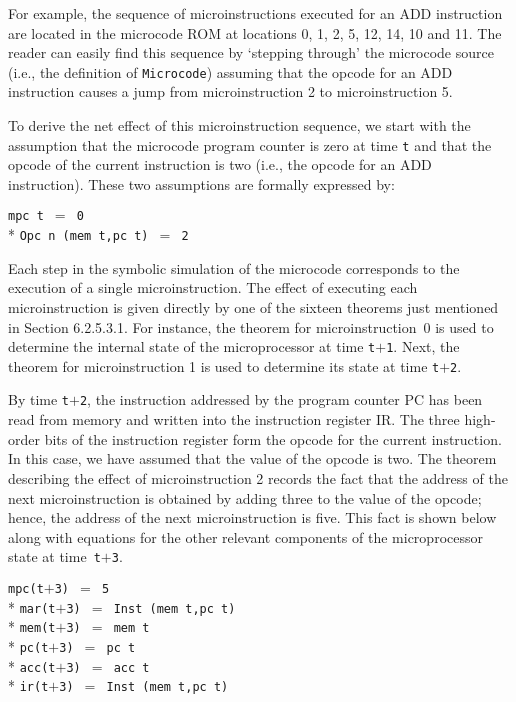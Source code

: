 \begin{normalsize}
For example, the sequence of microinstructions executed
for an ADD instruction are located in the microcode
ROM at locations 0, 1, 2, 5, 12, 14, 10 and 11.
The reader can easily find this sequence
by `stepping through' the microcode source
(i.e., the definition of \verb"Microcode")
assuming that the opcode for an ADD instruction
causes a jump from microinstruction 2 to microinstruction 5.

To derive the net effect of this microinstruction sequence,
we start with the assumption that the microcode program counter is zero
at time \verb"t" and
that the opcode of the current instruction
is two (i.e., the opcode for an ADD instruction).
These two assumptions are formally expressed by:

\hspace*{\fill}
\begin{minipage}{55mm}
\verb"mpc t "$=$\verb" 0"\\*
\verb"Opc n (mem t,pc t) "$=$\verb" 2"
\end{minipage}
\hspace*{\fill}

Each step in the
symbolic simulation of the microcode
corresponds to the execution of a single microinstruction.
The effect of executing each microinstruction is given directly
by one of the sixteen theorems just mentioned in Section 6.2.5.3.1.
For instance,
the theorem for \mbox{microinstruction 0} is used to determine
the internal state of the microprocessor at time \verb"t"$+$\verb"1".
Next, the theorem for microinstruction 1 is used to
determine its state at time \verb"t"$+$\verb"2".

By time \verb"t"$+$\verb"2",
the instruction addressed by the program counter PC has been
read from memory and written into the instruction register IR.
The three high-order bits of the instruction register form the
opcode for the current instruction.
In this case, we have assumed that the value of the opcode is two.
The theorem describing the effect of microinstruction 2 records
the fact that the address of the next microinstruction is obtained
by adding three to the value of the opcode;
hence, the address of the next microinstruction is five.
This fact is shown below along with equations for the other relevant components
of the microprocessor state at \mbox{time \verb"t"$+$\verb"3"}.

\hspace*{\fill}
\begin{minipage}{65mm}
\verb"mpc(t"$+$\verb"3) "$=$\verb" 5"\\*
\verb"mar(t"$+$\verb"3) "$=$\verb" Inst (mem t,pc t)"\\*
\verb"mem(t"$+$\verb"3) "$=$\verb" mem t"\\*
\verb"pc(t"$+$\verb"3) "$=$\verb" pc t"\\*
\verb"acc(t"$+$\verb"3) "$=$\verb" acc t"\\*
\verb"ir(t"$+$\verb"3) "$=$\verb" Inst (mem t,pc t)"
\end{minipage}
\hspace*{\fill}


\end{normalsize}
